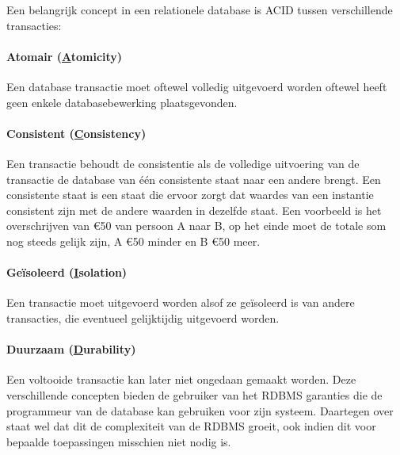 Een belangrijk concept in een relationele database is ACID tussen verschillende transacties:

\paragraph{Atomair (\underline{A}tomicity)} Een database transactie moet oftewel volledig uitgevoerd worden oftewel heeft geen enkele databasebewerking plaatsgevonden. 

	\paragraph{Consistent (\underline{C}onsistency)} Een transactie behoudt de consistentie als de volledige uitvoering van de transactie de database van één consistente staat naar een andere brengt. Een consistente staat is een staat die ervoor zorgt dat waardes van een instantie consistent zijn met de andere waarden in dezelfde staat. Een voorbeeld is het overschrijven van \euro{50} van persoon A naar B, op het einde moet de totale som nog steeds gelijk zijn, A \euro{50} minder en B \euro{50} meer. 
	
	\paragraph{Geïsoleerd (\underline{I}solation)} Een transactie moet uitgevoerd worden alsof ze geïsoleerd is van andere transacties, die eventueel gelijktijdig uitgevoerd worden. 
	
	\paragraph{Duurzaam (\underline{D}urability)} Een voltooide transactie kan later niet ongedaan gemaakt worden.
Deze verschillende concepten bieden de gebruiker van het RDBMS garanties die de programmeur van de database kan gebruiken voor zijn systeem. Daartegen over staat wel dat dit de complexiteit van de RDBMS groeit, ook indien dit voor bepaalde toepassingen misschien niet nodig is.

